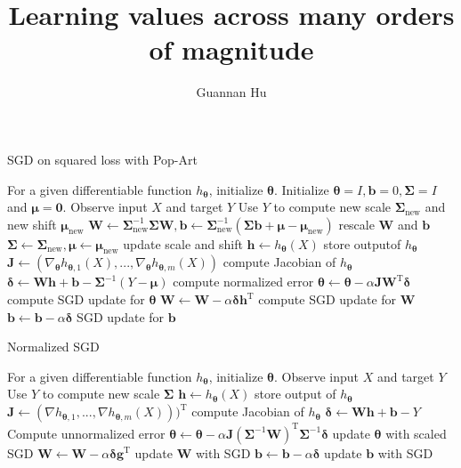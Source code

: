 \documentclass[12pt,a4paper]{article}
\begin{document}
\title{Learning values across many orders of magnitude \cite{Van2016Learning}}
\author{Guannan Hu}
\maketitle
\fi

\begin{algorithm}
\caption{SGD on squared loss with Pop-Art}
\begin{algorithmic}
\State For a given differentiable function $h_{\bm{\theta}}$, initialize $\bm{\theta}$.
\State Initialize $\bm{\theta} = I, \bm{b} = 0, \bm{\Sigma} =I$ and $\bm{\mu = 0}$.
	\State Observe input $X$ and target $Y$
	\State Use $Y$ to compute new scale $\bm{\Sigma}_{\text{new}}$ and new shift $\bm{\mu}_{\text{new}}$
	\State $\bm{W} \leftarrow \bm{\Sigma}_{\text{new}}^{-1}\bm{\Sigma}\bm{W}, \bm{b} \leftarrow \bm{\Sigma}_{\text{new}}^{-1}(\bm{\Sigma b} + \bm{\mu} - \bm{\mu}_{\text{new}})$ \Comment rescale $\bm{W}$ and $\bm{b}$
	\State $\bm{\Sigma} \leftarrow \bm{\Sigma}_{\text{new}}, \bm{\mu} \leftarrow \bm{\mu}_{\text{new}}$ \Comment update scale and shift
	\State $\bm{h} \leftarrow h_{\bm{\theta}}(X)$ \Comment store outputof $h_{\bm{\theta}}$ 
	\State $\bm{J} \leftarrow (\nabla_{\bm{\theta}}h_{\bm{\theta},1}(X), ..., \nabla_{\bm{\theta}}h_{\bm{\theta}, m}(X))$ \Comment compute Jacobian of $h_{\bm{\theta}}$
	\State $\bm{\delta} \leftarrow \bm{Wh} + \bm{b} - \bm{\Sigma}^{-1}(Y - \bm{\mu})$ \Comment compute normalized error
	\State $\bm{\theta} \leftarrow \bm{\theta} - \alpha\bm{J}\bm{W}^{\text{T}}\bm{\delta}$ \Comment compute SGD update for $\bm{\theta}$
	\State $\bm{W} \leftarrow \bm{W} - \alpha\bm{\delta}\bm{h}^{\text{T}}$ \Comment compute SGD update for $\bm{W}$
	\State $\bm{b} \leftarrow \bm{b} - \alpha\bm{\delta}$ \Comment SGD update for $\bm{b}$
\EndWhile
\end{algorithmic}
\end{algorithm}


\begin{algorithm}
\caption{Normalized SGD}
\begin{algorithmic}
\State For a given differentiable function $h_{\bm{\theta}}$, initialize $\bm{\theta}$.
	\State Observe input $X$ and target $Y$
	\State Use $Y$ to compute new scale $\bm{\Sigma}$
	\State $\bm{h} \leftarrow h_{\bm{\theta}}(X)$  \Comment store output of $h_{\bm{\theta}}$
	\State $\bm{J} \leftarrow (\nabla h_{\bm{\theta}, 1}, ..., \nabla h_{\bm{\theta}, m}(X)))^{\text{T}}$ \Comment compute Jacobian of $h_{\bm{\theta}}$
	\State $\bm{\delta} \leftarrow \bm{Wh} + \bm{b} - Y$ \Comment Compute unnormalized error 
	\State $\bm{\theta} \leftarrow \bm{\theta} - \alpha\bm{J}(\bm{\Sigma}^{-1}\bm{W})^{\text{T}}\bm{\Sigma}^{-1}\bm{\delta}$ \Comment update $\bm{\theta}$ with scaled SGD
	\State $\bm{W} \leftarrow \bm{W} - \alpha\bm{\delta}\bm{g}^{\text{T}}$ \Comment update $\bm{W}$ with SGD
	\State $\bm{b} \leftarrow \bm{b} - \alpha\bm{\delta}$ \Comment update $\bm{b}$ with SGD
\EndWhile
\end{algorithmic}
\end{algorithm}
\ifx\allfiles\undefined


\end{document}
